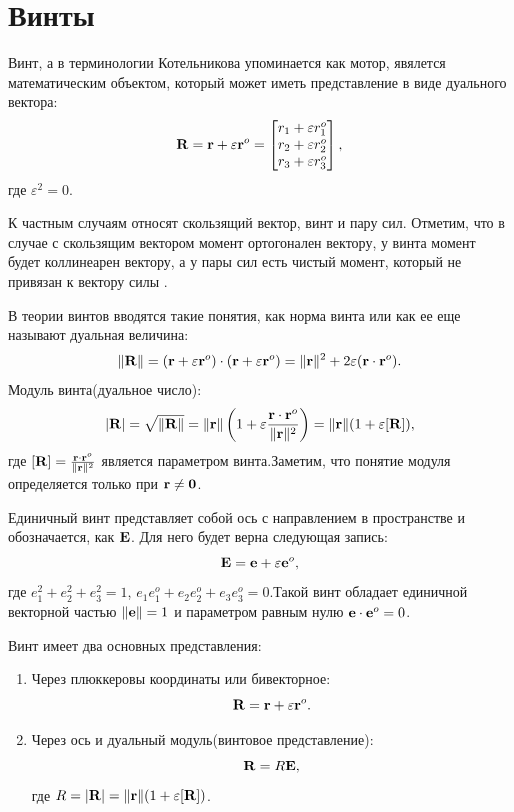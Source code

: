 \section{Винты}

Винт, а в терминологии Котельникова упоминается как мотор, явялется математическим объектом, который может иметь представление в виде дуального вектора:
\begin{equation*}
    \vb{R} = \vb{r} + \varepsilon \vb{r}^o = \begin{bmatrix} r_1 + \varepsilon r_1^o \\ r_2 + \varepsilon r_2^o \\ r_3 + \varepsilon r_3^o \end{bmatrix},
\end{equation*}
где $\varepsilon^2 = 0$.

К частным случаям относят скользящий вектор, винт и пару сил. Отметим, что в случае с скользящим вектором момент ортогонален вектору, у винта момент будет коллинеарен вектору, а у пары сил есть чистый момент, который не привязан к вектору силы .

В теории винтов вводятся такие понятия, как норма винта или как ее еще называют дуальная величина:
\begin{equation*}
    \|\vb{R}\| = (\vb{r} + \varepsilon \vb{r}^o) \cdot (\vb{r} + \varepsilon \vb{r}^o) = \|\vb{r}\|^2 + 2\varepsilon (\vb{r} \cdot \vb{r}^o).
\end{equation*}
Модуль винта(дуальное число):
\begin{equation*}
    |\vb{R}| = \sqrt{\|\vb{R}\|} = \|\vb{r}\| \left(1 + \varepsilon \frac{\vb{r} \cdot \vb{r}^o}{\|\vb{r}\|^2}\right) = \|\vb{r}\| (1 + \varepsilon [\vb{R}]),
\end{equation*}
где $[\vb{R}] = \frac{\vb{r} \cdot \vb{r}^o}{\|\vb{r}\|^2}$ является параметром винта.Заметим, что понятие модуля определяется только при $\vb{r} \neq \vb{0}$.

Единичный винт представляет собой ось с направлением в пространстве и обозначается, как $\vb{E}$. Для него будет верна следующая запись:
\begin{equation*}
    \vb{E} = \vb{e} + \varepsilon \vb{e}^o, 
\end{equation*}
где $e_1^2 + e_2^2 + e_3^2 = 1$, $e_1 e_1^o + e_2 e_2^o + e_3 e_3^o = 0$.Такой винт обладает единичной векторной частью $\|\vb{e}\| = 1$ и параметром равным нулю $\vb{e} \cdot \vb{e}^o = 0$.

Винт имеет два основных представления:
\begin{enumerate}
    \item Через плюккеровы координаты или бивекторное:
        \begin{equation*}
            \vb{R} = \vb{r} + \varepsilon \vb{r}^o.
        \end{equation*}
    \item Через ось и дуальный модуль(винтовое представление):
        \begin{equation*}
            \vb{R} = R \vb{E},
        \end{equation*}
        где $R = |\vb{R}| = \|\vb{r}\| (1 + \varepsilon [\vb{R}])$.
\end{enumerate}

